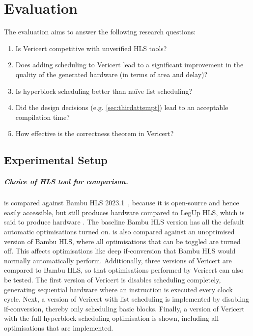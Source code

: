 \graphicspath{{./figures/5-hyperblock-scheduling/}}

\chapter{Evaluation}%
\label{sec:evaluation}%
\label{sec:performance-comparison}

The evaluation aims to answer the following research questions:

\begin{enumerate}[label=\textbf{RQ\arabic*}]
\item Is Vericert competitive with unverified HLS tools?
\item Does adding scheduling to Vericert lead to a significant improvement in
  the quality of the generated hardware (in terms of area and delay)?
\item Is hyperblock scheduling better than na\"ive list scheduling?
\item Did the design decisions (e.g. \cref{sec:thirdattempt}) lead to an
  acceptable compilation time?
\item How effective is the correctness theorem in Vericert?
\end{enumerate}

\section{Experimental Setup}

\def\polybench{PolyBench/C}

\paragraph{Choice of HLS tool for comparison.} \vericert{} is compared against
Bambu HLS 2023.1~\cite{ferrandi21_bambu}, because it is open-source and hence
easily accessible, but still produces hardware
 compared to LegUp HLS, which is said to produce hardware
.  The baseline Bambu HLS version has all the
default automatic optimisations turned on.  \vericert{} is also compared against
an unoptimised version of Bambu HLS, where all optimisations that can be toggled
are turned off.  This affects optimisations like deep if-conversion that Bambu
HLS would normally automatically perform.  Additionally, three versions of
Vericert are compared to Bambu HLS, so that optimisations performed by Vericert
can also be tested.  The first version of Vericert is disables scheduling
completely, generating sequential hardware where an instruction is executed
every clock cycle.  Next, a version of Vericert with list scheduling is
implemented by disabling if-conversion, thereby only scheduling basic blocks.
Finally, a version of Vericert with the full hyperblock scheduling optimisation
is shown, including all optimisations that are implemented.

